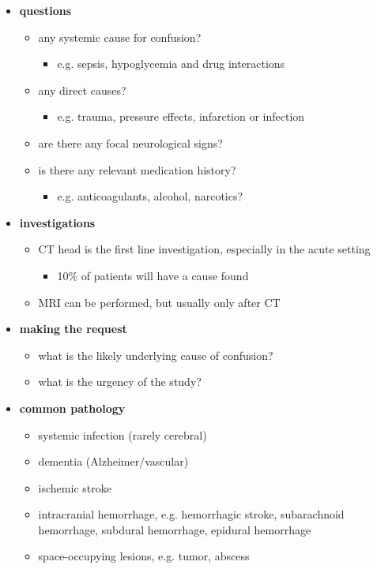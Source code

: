 \begin{itemize}
	\item
	\textbf{questions}
	
	\begin{itemize}
		\item
		any systemic cause for confusion?
		
		\begin{itemize}
			\item
			e.g. sepsis, hypoglycemia and drug interactions
		\end{itemize}
		\item
		any direct causes?
		
		\begin{itemize}
			\item
			e.g. trauma, pressure effects, infarction or infection
		\end{itemize}
		\item
		are there any focal neurological signs?
		\item
		is there any relevant medication history?
		
		\begin{itemize}
			\item
			e.g. anticoagulants, alcohol, narcotics?
		\end{itemize}
	\end{itemize}
	\item
	\textbf{investigations}
	
	\begin{itemize}
		\item
		CT head is the first line investigation, especially in the acute setting
		
		\begin{itemize}
			\item
			10\% of patients will have a cause found 
		\end{itemize}
		\item
		MRI can be performed, but usually only after CT
	\end{itemize}
	\item
	\textbf{making the request}
	
	\begin{itemize}
		\item
		what is the likely underlying cause of confusion?
		\item
		what is the urgency of the study?
	\end{itemize}
	\item
	\textbf{common pathology}
	
	\begin{itemize}
		\item
		systemic infection (rarely cerebral)
		\item
		dementia (Alzheimer/vascular)
		\item
		ischemic stroke
		\item
		intracranial hemorrhage, e.g. hemorrhagic stroke, subarachnoid hemorrhage, subdural hemorrhage, epidural hemorrhage
		\item
		space-occupying lesions, e.g. tumor, abscess
	\end{itemize}
\end{itemize}


